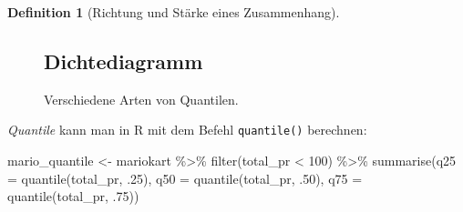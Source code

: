 \documentclass[
  a4paper,
  DIV=11]{scrreprt}
\newenvironment{Shaded}{\begin{snugshade}}{\end{snugshade}}
\newcommand{\AttributeTok}[1]{\textcolor[rgb]{0.40,0.45,0.13}{#1}}
\newcommand{\DecValTok}[1]{\textcolor[rgb]{0.68,0.00,0.00}{#1}}
\newcommand{\FunctionTok}[1]{\textcolor[rgb]{0.28,0.35,0.67}{#1}}
\newcommand{\NormalTok}[1]{\textcolor[rgb]{0.00,0.23,0.31}{#1}}
\newcommand{\OtherTok}[1]{\textcolor[rgb]{0.00,0.23,0.31}{#1}}
\newcommand{\SpecialCharTok}[1]{\textcolor[rgb]{0.37,0.37,0.37}{#1}}
\theoremstyle{definition}
\theoremstyle{definition}
\theoremstyle{definition}
\newtheorem{definition}{Definition}[chapter]
\theoremstyle{remark}
\begin{document}
\begin{definition}[Richtung und Stärke eines
Zusammenhang]
\begin{figure}
{{}


\subsection{Dichtediagramm}



}

\caption{\label{fig-quantile-mario}Verschiedene Arten von Quantilen.}

\end{figure}%

\emph{Quantile} kann man in R mit dem Befehl \texttt{quantile()}
berechnen:

\begin{Shaded}
\begin{Highlighting}[]
\NormalTok{mario\_quantile }\OtherTok{\textless{}{-}} 
\NormalTok{mariokart }\SpecialCharTok{\%\textgreater{}\%} 
  \FunctionTok{filter}\NormalTok{(total\_pr }\SpecialCharTok{\textless{}} \DecValTok{100}\NormalTok{) }\SpecialCharTok{\%\textgreater{}\%} 
  \FunctionTok{summarise}\NormalTok{(}\AttributeTok{q25 =} \FunctionTok{quantile}\NormalTok{(total\_pr, .}\DecValTok{25}\NormalTok{),}
            \AttributeTok{q50 =} \FunctionTok{quantile}\NormalTok{(total\_pr, .}\DecValTok{50}\NormalTok{),}
            \AttributeTok{q75 =} \FunctionTok{quantile}\NormalTok{(total\_pr, .}\DecValTok{75}\NormalTok{))}
\end{Highlighting}
\end{Shaded}


\end{definition}
\end{document}

